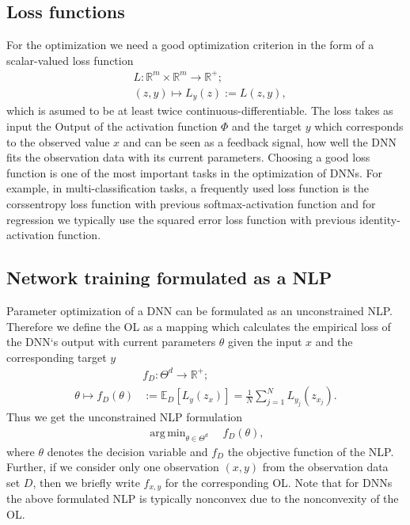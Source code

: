 \documentclass[conference]{IEEEtran}
\DeclareMathOperator*{\argmin}{arg\,min}
\begin{document}
\subsection{Loss functions}
For the optimization we need a good optimization criterion in the form of a scalar-valued loss function
\begin{align}
&L:\mathbb{R}^{m}\times \mathbb{R}^{m}\rightarrow \mathbb{R}^{+};\\
&(z, y)\mapsto L_{y}(z) := L(z, y),
\end{align}
which is asumed to be at least twice continuous-differentiable. The loss takes as input the Output of the activation function $\Phi$ and the target $y$ which corresponds to the observed value $x$ and can be seen as a feedback signal, how well the DNN fits the observation data with its current parameters. Choosing a good loss function is one of the most important tasks in the optimization of DNNs. For example, in multi-classification tasks, a frequently used loss function is the corssentropy loss function with previous softmax-activation function and for regression we typically use the squared error loss function with previous identity-activation function.

\subsection{Network training formulated as a NLP}
Parameter optimization of a DNN can be formulated as an unconstrained NLP. Therefore we define the OL as a mapping which calculates the empirical loss of the DNN`s output with current parameters $\theta$ given the input $x$ and the corresponding target $y$
\begin{align}
&f_{D}:\Theta^{d}\rightarrow\mathbb{R}^{+};\\
\theta\mapsto f_{D}(\theta) &:= \mathbb{E}_{D}[L_{y}(z_{x})] =  \frac{1}{N}\sum_{j = 1}^{N}L_{y_{j}}(z_{x_{j}}).
\end{align}
Thus we get the unconstrained NLP formulation
\begin{align}
\argmin_{\theta\in\Theta^{d}}\quad f_{D}(\theta),
\end{align}
where $\theta$ denotes the decision variable and $f_{D}$ the objective function of the NLP.
Further, if we consider only one observation $(x, y)$ from the observation data set $D$, then we briefly write  $f_{x, y}$ for the corresponding OL. Note that for DNNs the above formulated NLP is typically nonconvex due to the nonconvexity of the OL.
\end{document}

